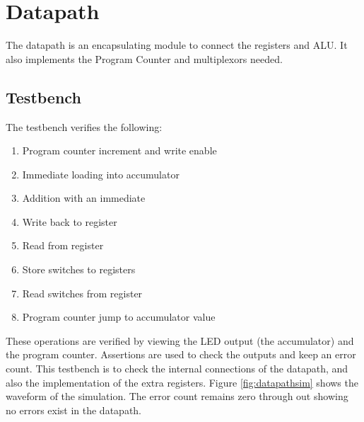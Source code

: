 


\section{Datapath}\label{sect:datapath}
The datapath is an encapsulating module to connect the registers and ALU.
It also implements the Program Counter and multiplexors needed. 

\subsection{Testbench}
The testbench verifies the following: %
\begin{enumerate}
\item Program counter increment and write enable
\item Immediate loading into accumulator
\item Addition with an immediate
\item Write back to register
\item Read from register
\item Store switches to registers
\item Read switches from register
\item Program counter jump to accumulator value
\end{enumerate}

These operations are verified by viewing the LED output (the accumulator) and the program counter.
Assertions are used to check the outputs and keep an error count. 
This testbench is to check the internal connections of the datapath, and also the implementation of the extra registers.
Figure \ref{fig:datapathsim} shows the waveform of the simulation. 
The error count remains zero through out showing no errors exist in the datapath.

